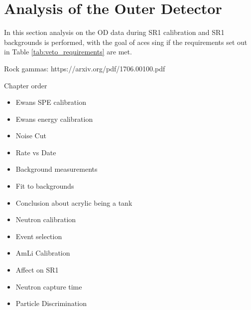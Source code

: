 \chapter{Analysis of the Outer Detector} \label{chap:analysis_of_the_od}

In this section analysis on the OD data during SR1 calibration and SR1 backgrounds is performed, with the goal of aces sing if the requirements set out in Table \ref{tab:veto_requirements} are met.

Rock gammas: https://arxiv.org/pdf/1706.00100.pdf

Chapter order
\begin{itemize}
    \item Ewans SPE calibration
    \item Ewans energy calibration
    \item Noise Cut
    \item Rate vs Date
    \item Background measurements
    \item Fit to backgrounds
    \item Conclusion about acrylic being a tank
    \item Neutron calibration
    \item Event selection
    \item AmLi Calibration
    \item Affect on SR1
    \item Neutron capture time
    \item Particle Discrimination
\end{itemize}







